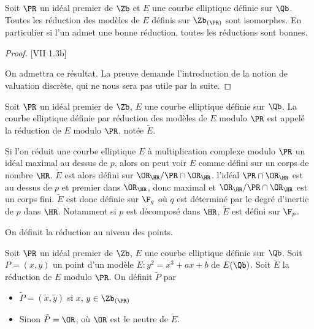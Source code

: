 \begin{Prop}
	
	Soit $\PR$ un idéal premier de $\Zb$ et $E$ une courbe elliptique définie sur $\Qb$. Toutes les réduction des modèles de $E$ définis sur $\Zb_{\left( \PR\right) }$ sont isomorphes. En particulier si l'un admet une bonne réduction, toutes les réductions sont bonnes.
\end{Prop}

\begin{proof}\cite{Sil94}[VII 1.3b]
	
	On admettra ce résultat. La preuve demande l'introduction de la notion de valuation discrète, qui ne nous sera pas utile par la suite.
\end{proof}

\begin{Def}
	Soit $\PR$ un idéal premier de $\Zb$, $E$ une courbe elliptique définie sur $\Qb$. La courbe elliptique définie par réduction des modèles de $E$ modulo $\PR$ est appelé la réduction de $E$ modulo $\PR$, notée $\tilde{E}$. 
\end{Def}

\begin{Rem}
	Si l'on réduit une courbe elliptique $E$ à multiplication complexe modulo $\PR$ un idéal maximal au dessus de $p$, alors on peut voir $E$ comme défini sur un corps de nombre $\HR$. $\tilde{E}$ est alors défini sur $\OR_{\HR}/\PR\cap\OR_{\HR}$. l'idéal $\PR\cap\OR_{\HR}$ est au dessus de $p$ et premier dans $\OR_{\HR}$, donc maximal et $\OR_{\HR}/\PR\cap\OR_{\HR}$ est un corps fini. $\tilde{E}$ est donc définie sur $\F_{q}$ où $q$ est déterminé par le degré d'inertie de $p$ dans $\HR$. Notamment si $p$ est décomposé dans $\HR$, $\tilde{E}$ est défini sur $\F_{p}$.
\end{Rem}

On définit la réduction au niveau des points.

\begin{Def}
	Soit $\PR$ un idéal premier de $\Zb$, $E$ une courbe elliptique définie sur $\Qb$. Soit $P = (x,y)$ un point d'un modèle $E : y^2 = x^3 + ax + b$ de $E(\Qb)$. Soit $\tilde{E}$ la réduction de $E$ modulo $\PR$. On définit $\tilde{P}$ par
	\begin{itemize}
		\item $\tilde{P} = (\tilde{x},\tilde{y})$ si $x$, $y\in\Zb_{\left( \PR\right) }$
		\item Sinon $\tilde{P} = \OR$, où $\OR$ est le neutre de $\tilde{E}$.
	\end{itemize}
\end{Def}

